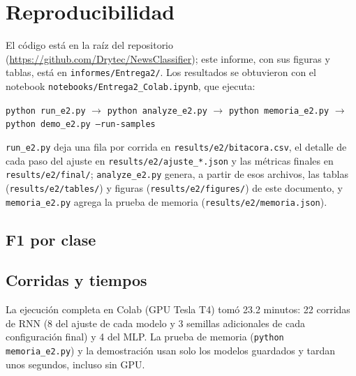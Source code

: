 \documentclass[12pt, a4paper]{article}
\newcommand{\tabla}[1]{}
\begin{document}
\appendix
\section{Reproducibilidad}\label{sec:anexo}

El código está en la raíz del repositorio (\url{https://github.com/Drytec/NewsClassifier}); este informe, con sus figuras y tablas, está en \nolinkurl{informes/Entrega2/}. Los resultados se obtuvieron con el notebook \nolinkurl{notebooks/Entrega2_Colab.ipynb}, que ejecuta:
\begin{center}
\texttt{python run\_e2.py} $\rightarrow$ \texttt{python analyze\_e2.py} $\rightarrow$ \texttt{python memoria\_e2.py} $\rightarrow$ \texttt{python demo\_e2.py --run-samples}
\end{center}
\texttt{run\_e2.py} deja una fila por corrida en \texttt{results/e2/bitacora.csv}, el detalle de cada paso del ajuste en \texttt{results/e2/ajuste\_*.json} y las métricas finales en \texttt{results/e2/final/}; \texttt{analyze\_e2.py} genera, a partir de esos archivos, las tablas (\texttt{results/e2/tables/}) y figuras (\texttt{results/e2/figures/}) de este documento, y \texttt{memoria\_e2.py} agrega la prueba de memoria (\texttt{results/e2/memoria.json}).

\subsection{F1 por clase}

\begin{table}[H]
\centering
\caption{F1 por clase en el conjunto de prueba (semilla 42).}
\label{tab:por_clase}
\small
\tabla{por_clase}
\end{table}

\subsection{Corridas y tiempos}

La ejecución completa en Colab (GPU Tesla T4) tomó 23.2 minutos: 22 corridas de RNN (8 del ajuste de cada modelo y 3 semillas adicionales de cada configuración final) y 4 del MLP. La prueba de memoria (\texttt{python memoria\_e2.py}) y la demostración usan solo los modelos guardados y tardan unos segundos, incluso sin GPU.
\end{document}
